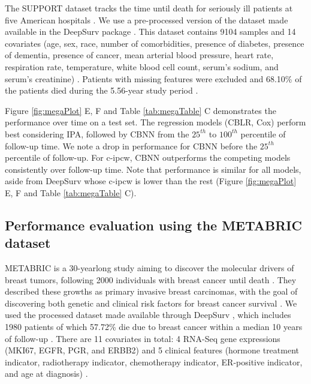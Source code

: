 \documentclass[AMA,STIX1COL,]{WileyNJD-v2}
\begin{document}
The SUPPORT dataset tracks the time until death for seriously ill
patients at five American hospitals \citep{knaus1995SUPPORT}. We use a
pre-processed version of the dataset made available in the DeepSurv
package \citep{katzman2018DeepSurv}. This dataset contains 9104 samples
and 14 covariates (age, sex, race, number of comorbidities, presence of
diabetes, presence of dementia, presence of cancer, mean arterial blood
pressure, heart rate, respiration rate, temperature, white blood cell
count, serum's sodium, and serum's creatinine)
\citep{katzman2018DeepSurv}. Patients with missing features were
excluded and 68.10\% of the patients died during the 5.56-year study
period \citep{katzman2018DeepSurv}.

Figure \ref{fig:megaPlot} E, F and Table \ref{tab:megaTable} C
demonstrates the performance over time on a test set. The regression
models (CBLR, Cox) perform best considering IPA, followed by CBNN from
the \(25^{th}\) to \(100^{th}\) percentile of follow-up time. We note a
drop in performance for CBNN before the \(25^{th}\) percentile of
follow-up. For c-ipcw, CBNN outperforms the competing models
consistently over follow-up time. Note that performance is similar for
all models, aside from DeepSurv whose c-ipcw is lower than the rest
(Figure \ref{fig:megaPlot} E, F and Table \ref{tab:megaTable} C).

\hypertarget{performance-evaluation-using-the-metabric-dataset}{%
\subsection{Performance evaluation using the METABRIC
dataset}\label{performance-evaluation-using-the-metabric-dataset}}

METABRIC is a 30-yearlong study aiming to discover the molecular drivers
of breast tumors, following 2000 individuals with breast cancer until
death \citep{curtis2012genomic}. They described these growths as primary
invasive breast carcinomas, with the goal of discovering both genetic
and clinical risk factors for breast cancer survival
\citep{curtis2012genomic}. We used the processed dataset made available
through DeepSurv \citep{katzman2018DeepSurv}, which includes 1980
patients of which 57.72\% die due to breast cancer within a median 10
years of follow-up \citep{katzman2018DeepSurv}. There are 11 covariates
in total: 4 RNA-Seq gene expressions (MKI67, EGFR, PGR, and ERBB2) and 5
clinical features (hormone treatment indicator, radiotherapy indicator,
chemotherapy indicator, ER-positive indicator, and age at diagnosis)
\citep{katzman2018DeepSurv}.
\end{document}
